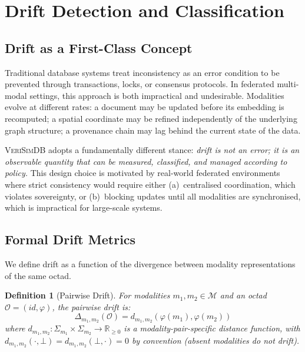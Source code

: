 \documentclass[11pt,twocolumn]{article}
\newtheorem{definition}{Definition}[section]
\newcommand{\verisimdb}{\textsc{VeriSimDB}\xspace}
\newcommand{\octad}{\mathcal{O}}
\newcommand{\modset}{\mathcal{M}}
\newcommand{\driftfn}{\Delta}
\begin{document}
\section{Drift Detection and Classification}\label{sec:drift}

\subsection{Drift as a First-Class Concept}

Traditional database systems treat inconsistency as an error condition to be
prevented through transactions, locks, or consensus protocols.  In federated
multi-modal settings, this approach is both impractical and undesirable.
Modalities evolve at different rates: a document may be updated before its
embedding is recomputed; a spatial coordinate may be refined independently of
the underlying graph structure; a provenance chain may lag behind the current
state of the data.

\verisimdb adopts a fundamentally different stance: \emph{drift is not an
error; it is an observable quantity that can be measured, classified, and
managed according to policy.}  This design choice is motivated by real-world
federated environments where strict consistency would require either
(a)~centralised coordination, which violates sovereignty, or (b)~blocking
updates until all modalities are synchronised, which is impractical for
large-scale systems.

\subsection{Formal Drift Metrics}

We define drift as a function of the divergence between modality
representations of the same octad.

\begin{definition}[Pairwise Drift]\label{def:pairwise-drift}
For modalities $m_1, m_2 \in \modset$ and an octad $\octad = (\mathit{id}, \varphi)$,
the \emph{pairwise drift} is:
\[
  \driftfn_{m_1, m_2}(\octad) = d_{m_1, m_2}(\varphi(m_1), \varphi(m_2))
\]
where $d_{m_1, m_2} : \Sigma_{m_1} \times \Sigma_{m_2} \to \mathbb{R}_{\geq 0}$
is a modality-pair-specific distance function, with $d_{m_1, m_2}(\cdot, \bot) =
d_{m_1, m_2}(\bot, \cdot) = 0$ by convention (absent modalities do not drift).
\end{definition}
\end{document}
